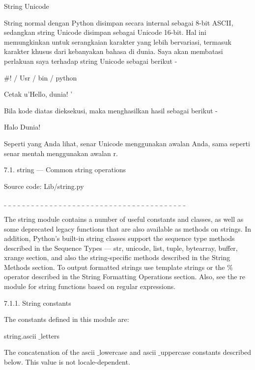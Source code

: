 String Unicode \par
String normal dengan Python disimpan secara internal sebagai 8-bit ASCII, sedangkan string Unicode disimpan sebagai Unicode 16-bit. Hal ini memungkinkan untuk serangkaian karakter yang lebih bervariasi, termasuk karakter khusus dari kebanyakan bahasa di dunia. Saya akan membatasi perlakuan saya terhadap string Unicode sebagai berikut - \par
\vspace{12pt}
 $  \#  $! / Usr / bin / python \par
\vspace{12pt}
Cetak u'Hello, dunia! ' \par
Bila kode diatas dieksekusi, maka menghasilkan hasil sebagai berikut - \par
Halo Dunia! \par
Seperti yang Anda lihat, senar Unicode menggunakan awalan Anda, sama seperti senar mentah menggunakan awalan r. \par
\vspace{12pt}
7.1. string — Common string operations \par
Source code: Lib/string.py \par
 $  \_  $ $  \_  $ $  \_  $ $  \_  $ $  \_  $ $  \_  $ $  \_  $ $  \_  $ $  \_  $ $  \_  $ $  \_  $ $  \_  $ $  \_  $ $  \_  $ $  \_  $ $  \_  $ $  \_  $ $  \_  $ $  \_  $ $  \_  $ $  \_  $ $  \_  $ $  \_  $ $  \_  $ $  \_  $ $  \_  $ $  \_  $ $  \_  $ $  \_  $ $  \_  $ $  \_  $ $  \_  $ $  \_  $ $  \_  $ $  \_  $ $  \_  $ $  \_  $ $  \_  $ $  \_  $ $  \_  $ \par
The string module contains a number of useful constants and classes, as well as some deprecated legacy functions that are also available as methods on strings. In addition, Python’s built-in string classes support the sequence type methods described in the Sequence Types — str, unicode, list, tuple, bytearray, buffer, xrange section, and also the string-specific methods described in the String Methods section. To output formatted strings use template strings or the  $  \%  $ operator described in the String Formatting Operations section. Also, see the re module for string functions based on regular expressions. \par
7.1.1. String constants \par
The constants defined in this module are: \par
string.ascii $  \_  $letters \par
The concatenation of the ascii $  \_  $lowercase and ascii $  \_  $uppercase constants described below. This value is not locale-dependent. \par

